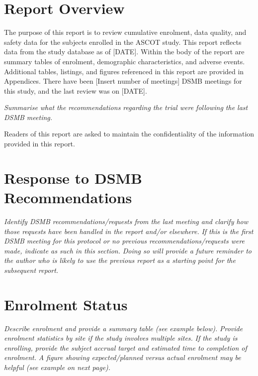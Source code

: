 \documentclass[
  11pt,
]{article}
\begin{document}
\clearpage

\hypertarget{report-overview}{%
\section{Report Overview}\label{report-overview}}

The purpose of this report is to review cumulative enrolment, data quality, and safety data for the subjects enrolled in the ASCOT study.
This report reflects data from the study database as of {[}DATE{]}.
Within the body of the report are summary tables of enrolment, demographic characteristics, and adverse events.
Additional tables, listings, and figures referenced in this report are provided in Appendices.
There have been {[}Insert number of meetings{]} DSMB meetings for this study, and the last review was on {[}DATE{]}.

\emph{Summarise what the recommendations regarding the trial were following the last DSMB meeting.}

Readers of this report are asked to maintain the confidentiality of the information provided in this report.

\clearpage

\hypertarget{response-to-dsmb-recommendations}{%
\section{Response to DSMB Recommendations}\label{response-to-dsmb-recommendations}}

\emph{Identify DSMB recommendations/requests from the last meeting and clarify how those requests have been handled in the report and/or elsewhere.} \emph{If this is the first DSMB meeting for this protocol or no previous recommendations/requests were made, indicate as such in this section.} \emph{Doing so will provide a future reminder to the author who is likely to use the previous report as a starting point for the subsequent report.}

\clearpage

\hypertarget{enrolment-status}{%
\section{Enrolment Status}\label{enrolment-status}}

\emph{Describe enrolment and provide a summary table (see example below).} \emph{Provide enrolment statistics by site if the study involves multiple sites.} \emph{If the study is enrolling, provide the subject accrual target and estimated time to completion of enrolment.} \emph{A figure showing expected/planned versus actual enrolment may be helpful (see example on next page).}
\end{document}
